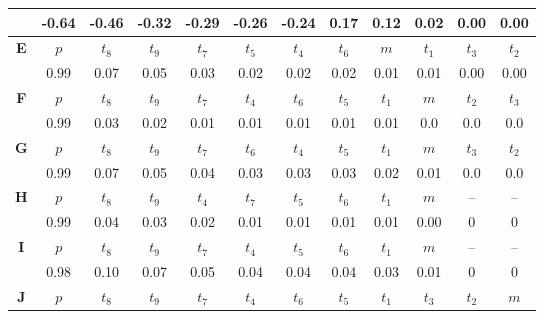\documentclass[svgnames, table, smaller]{beamer}
\begin{document}
\begin{frame}
{\begin{table}[!ht]
\begin{tabular}{|c|c|c|c|c|c|c|c|c|c|c|c|}
    & -0.64 & -0.46 & -0.32 & -0.29 & -0.26 & -0.24 & 0.17 & 0.12 & 0.02 & 0.00 & 0.00 \\
    \hline
    \multirow{2}{*}{\textbf{E}} & $p$ & \cellcolor[gray]{0.45} $t_8$ & \cellcolor[gray]{0.50} $t_9$ &  \cellcolor[gray]{0.65} $t_7$ & \cellcolor[gray]{0.70} $t_5$ & \cellcolor[gray]{0.60} $t_4$ & \cellcolor[gray]{0.75} $t_6$ & $m$ & \cellcolor[gray]{0.40} $t_1$ & \cellcolor[gray]{0.80} $t_3$ & \cellcolor[gray]{0.55} $t_2$ \\
    & 0.99 & 0.07 & 0.05 & 0.03 & 0.02 & 0.02 & 0.02 & 0.01 & 0.01 & 0.00 & 0.00 \\ 
    \hline
    \multirow{2}{*}{\textbf{F}} & $p$ & \cellcolor[gray]{0.45} $t_8$ & \cellcolor[gray]{0.50} $t_9$ &  \cellcolor[gray]{0.65} $t_7$ & \cellcolor[gray]{0.60} $t_4$ & \cellcolor[gray]{0.75} $t_6$ & \cellcolor[gray]{0.70} $t_5$ & \cellcolor[gray]{0.40} $t_1$ & $m$ & \cellcolor[gray]{0.55} $t_2$ & \cellcolor[gray]{0.80} $t_3$ \\
    & 0.99 & 0.03 & 0.02 & 0.01 & 0.01 & 0.01 & 0.01 & 0.01 & 0.0 & 0.0 & 0.0 \\ 
    \hline
    \multirow{2}{*}{\textbf{G}} & $p$ & \cellcolor[gray]{0.45} $t_8$ & \cellcolor[gray]{0.50} $t_9$ & \cellcolor[gray]{0.65} $t_7$ & \cellcolor[gray]{0.75} $t_6$ & \cellcolor[gray]{0.60} $t_4$ & \cellcolor[gray]{0.70} $t_5$ & \cellcolor[gray]{0.40} $t_1$ & $m$ & \cellcolor[gray]{0.80} $t_3$ & \cellcolor[gray]{0.55} $t_2$ \\
    & 0.99 & 0.07 & 0.05 & 0.04 & 0.03 & 0.03 & 0.03 & 0.02 & 0.01 & 0.0 & 0.0 \\ 
    \hline
    \multirow{2}{*}{\textbf{H}} & $p$ & \cellcolor[gray]{0.45} $t_8$ & \cellcolor[gray]{0.50} $t_9$ & \cellcolor[gray]{0.60} $t_4$ &\cellcolor[gray]{0.65} $t_7$ &\cellcolor[gray]{0.70} $t_5$ &\cellcolor[gray]{0.75} $t_6$ &\cellcolor[gray]{0.40} $t_1$ & $m$ & -- & -- \\
    & 0.99 & 0.04 & 0.03 & 0.02 & 0.01 & 0.01 & 0.01 & 0.01 & 0.00 & 0 & 0 \\ 
    \hline
    \multirow{2}{*}{\textbf{I}} & $p$ &\cellcolor[gray]{0.45} $t_8$ & \cellcolor[gray]{0.50} $t_9$ & \cellcolor[gray]{0.65} $t_7$ &\cellcolor[gray]{0.60} $t_4$ &\cellcolor[gray]{0.70} $t_5$ &\cellcolor[gray]{0.75} $t_6$ &\cellcolor[gray]{0.40} $t_1$ & $m$ & -- & -- \\
    & 0.98 & 0.10 & 0.07 & 0.05 & 0.04 & 0.04 & 0.04 & 0.03 & 0.01 & 0 & 0 \\ 
    \hline
    \multirow{2}{*}{\textbf{J}} & $p$ &\cellcolor[gray]{0.45} $t_8$ &\cellcolor[gray]{0.50} $t_9$ & \cellcolor[gray]{0.65} $t_7$ & \cellcolor[gray]{0.60} $t_4$ &\cellcolor[gray]{0.75} $t_6$ &\cellcolor[gray]{0.70} $t_5$ &\cellcolor[gray]{0.40} $t_1$ &\cellcolor[gray]{0.80} $t_3$ &\cellcolor[gray]{0.55} $t_2$ & $m$ \\

\end{tabular}
\end{table}}
\end{frame}
\end{document}
